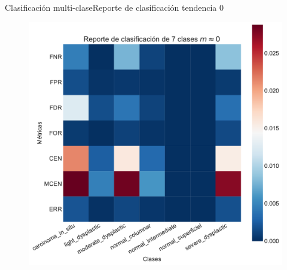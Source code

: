 \documentclass{beamer}
\begin{document}
    \begin{frame}{Clasificación multi-clase}{Reporte de clasificación tendencia 0}
        \begin{figure}[]
            \centering
            \includegraphics[height=0.95\textheight]{reporte_7_class/reporte_cero.pdf}
            
        \end{figure}
    \end{frame}
\end{document}
